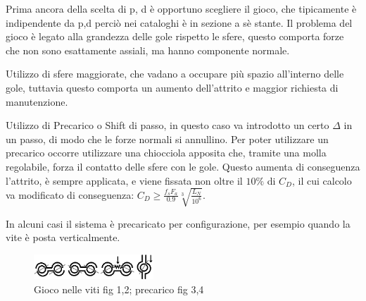 Prima ancora della scelta di p, d è opportuno scegliere il gioco, che tipicamente è indipendente da p,d perciò nei cataloghi è in sezione a sè stante.
Il problema del gioco è legato alla grandezza delle gole rispetto le sfere, questo comporta forze che non sono esattamente assiali, ma hanno componente normale.

Utilizzo di sfere maggiorate, che vadano a occupare più spazio all'interno delle gole, tuttavia questo comporta un aumento dell'attrito e maggior richiesta di manutenzione.

Utilizzo di Precarico o Shift di passo, in questo caso va introdotto un certo \(\Delta\) in un passo, di modo che le forze normali si annullino. Per poter utilizzare un precarico occorre utilizzare una chiocciola apposita che, tramite una molla regolabile, forza il contatto delle sfere con le gole. Questo aumenta di conseguenza l'attrito, è sempre applicata, e viene fissata non oltre il \(10\%\) di \(C_D\), il cui calcolo va modificato di conseguenza: \( C_D \geqslant \frac{f_s F_a}{0.9} \sqrt[3]{\frac{L_N}{10^6}} \).

In alcuni casi il sistema è precaricato per configurazione, per esempio quando la vite è posta verticalmente.

\begin{figure}[h]
    \centering
    \includegraphics[width=0.4\textwidth]{Immagini/gioco_viti_ricircolo.png}
    \caption{Gioco nelle viti fig 1,2; precarico fig 3,4}
\end{figure}